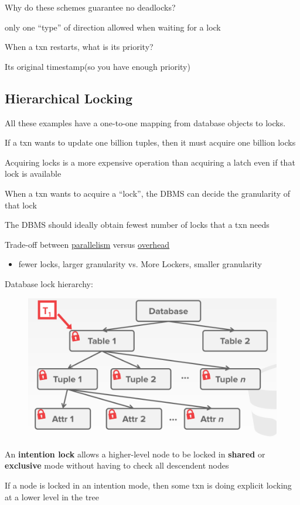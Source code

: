 \documentclass[11pt]{article}
\begin{document}
Why do these schemes guarantee no deadlocks?

only one ``type'' of direction allowed when waiting for a lock

When a txn restarts, what is its priority?

Its original timestamp(so you have enough priority)
\subsection{Hierarchical Locking}
\label{sec:org74ab33d}
All these examples have a one-to-one mapping from database objects to locks.

If a txn wants to update one billion tuples, then it must acquire one billion locks

Acquiring locks is a more expensive operation than acquiring a latch even if that lock is
available

When a txn wants to acquire a ``lock'', the DBMS can decide the granularity of that lock

The DBMS should ideally obtain fewest number of locks that a txn needs

Trade-off between \uline{parallelism} versus \uline{overhead}
\begin{itemize}
\item fewer locks, larger granularity vs. More Lockers, smaller granularity
\end{itemize}

Database lock hierarchy:
\begin{figure}[htbp]
\centering
\includegraphics[width=.8\textwidth]{../images/15445/63.png}
\label{}
\end{figure}


An \textbf{intention lock} allows a higher-level node to be locked in \textbf{shared} or \textbf{exclusive} mode without
having to check all descendent nodes

If a node is locked in an intention mode, then some txn is doing explicit locking at a lower
level in the tree
\end{document}
